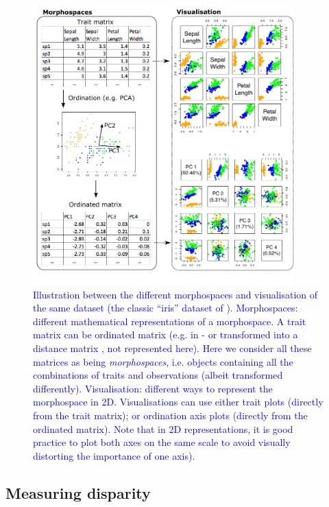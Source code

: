 \documentclass[12pt,letterpaper]{article}
\begin{document}
\begin{figure}[!htbp]
\centering
   \includegraphics[width=0.9\textwidth]{Figures/figure_space2.pdf}
\caption{
    \textcolor{blue}{Illustration between the different morphospaces and visualisation of the same dataset (the classic ``iris'' dataset of} \citealt{edgar1935irises,fisher1936use}).
    \textcolor{blue}{Morphospaces: different mathematical representations of a morphospace. A trait matrix can be ordinated matrix (e.g. in }\citealt{tyler2011detecting}\textcolor{blue}{ - or transformed into a distance matrix }\citealt{Close2015}\textcolor{blue}{, not represented here).}
    \textcolor{blue}{Here we consider all these matrices as being \textit{morphospaces}, i.e. objects containing all the combinations of traits and observations (albeit transformed differently).
    Visualisation: different  ways to represent the morphospace in 2D.
    Visualisations can use either trait plots (directly from the trait matrix); or ordination axis plots (directly from the ordinated matrix).
    Note that in 2D representations, it is good practice to plot both axes on the same scale to avoid visually distorting the importance of one axis).}
}
\label{Fig:morphospace}
\end{figure}

\subsection{Measuring disparity} \label{section:metrics}
\end{document}
